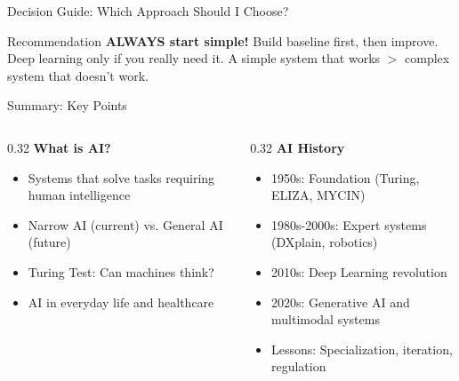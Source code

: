 \documentclass[aspectratio=169, 10pt]{beamer}
\begin{document}
\begin{frame}{Decision Guide: Which Approach Should I Choose?}
    \vspace{2mm}
    \begin{alertblock}{\footnotesize Recommendation}
        \footnotesize
        \textbf{ALWAYS start simple!} Build baseline first, then improve. Deep learning only if you really need it. A simple system that works $>$ complex system that doesn't work.
    \end{alertblock}

\end{frame}

\begin{frame}{Summary: Key Points}

    \begin{columns}
        \begin{column}{0.32\textwidth}
            \textbf{\footnotesize What is AI?}
            \scriptsize
            \begin{itemize}\setlength{\itemsep}{0pt}
                \item Systems that solve tasks requiring human intelligence
                \item Narrow AI (current) vs. General AI (future)
                \item Turing Test: Can machines think?
                \item AI in everyday life and healthcare
            \end{itemize}
        \end{column}

        \begin{column}{0.32\textwidth}
            \textbf{\footnotesize AI History}
            \scriptsize
            \begin{itemize}\setlength{\itemsep}{0pt}
                \item 1950s: Foundation (Turing, ELIZA, MYCIN)
                \item 1980s-2000s: Expert systems (DXplain, robotics)
                \item 2010s: Deep Learning revolution
                \item 2020s: Generative AI and multimodal systems
                \item Lessons: Specialization, iteration, regulation
            \end{itemize}
        \end{column}


\end{columns}
\end{frame}
\end{document}
